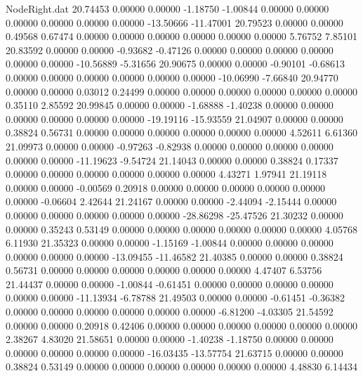 \begin{filecontents}{NodeRight.dat}
  20.74453    0.00000    0.00000    -1.18750   -1.00844    0.00000    0.00000    0.00000    0.00000    0.00000    0.00000  -13.50666  -11.47001
  20.79523    0.00000    0.00000     0.49568    0.67474    0.00000    0.00000    0.00000    0.00000    0.00000    0.00000    5.76752    7.85101
  20.83592    0.00000    0.00000    -0.93682   -0.47126    0.00000    0.00000    0.00000    0.00000    0.00000    0.00000  -10.56889   -5.31656
  20.90675    0.00000    0.00000    -0.90101   -0.68613    0.00000    0.00000    0.00000    0.00000    0.00000    0.00000  -10.06990   -7.66840
  20.94770    0.00000    0.00000     0.03012    0.24499    0.00000    0.00000    0.00000    0.00000    0.00000    0.00000    0.35110    2.85592
  20.99845    0.00000    0.00000    -1.68888   -1.40238    0.00000    0.00000    0.00000    0.00000    0.00000    0.00000  -19.19116  -15.93559
  21.04907    0.00000    0.00000     0.38824    0.56731    0.00000    0.00000    0.00000    0.00000    0.00000    0.00000    4.52611    6.61360
  21.09973    0.00000    0.00000    -0.97263   -0.82938    0.00000    0.00000    0.00000    0.00000    0.00000    0.00000  -11.19623   -9.54724
  21.14043    0.00000    0.00000     0.38824    0.17337    0.00000    0.00000    0.00000    0.00000    0.00000    0.00000    4.43271    1.97941
  21.19118    0.00000    0.00000    -0.00569    0.20918    0.00000    0.00000    0.00000    0.00000    0.00000    0.00000   -0.06604    2.42644
  21.24167    0.00000    0.00000    -2.44094   -2.15444    0.00000    0.00000    0.00000    0.00000    0.00000    0.00000  -28.86298  -25.47526
  21.30232    0.00000    0.00000     0.35243    0.53149    0.00000    0.00000    0.00000    0.00000    0.00000    0.00000    4.05768    6.11930
  21.35323    0.00000    0.00000    -1.15169   -1.00844    0.00000    0.00000    0.00000    0.00000    0.00000    0.00000  -13.09455  -11.46582
  21.40385    0.00000    0.00000     0.38824    0.56731    0.00000    0.00000    0.00000    0.00000    0.00000    0.00000    4.47407    6.53756
  21.44437    0.00000    0.00000    -1.00844   -0.61451    0.00000    0.00000    0.00000    0.00000    0.00000    0.00000  -11.13934   -6.78788
  21.49503    0.00000    0.00000    -0.61451   -0.36382    0.00000    0.00000    0.00000    0.00000    0.00000    0.00000   -6.81200   -4.03305
  21.54592    0.00000    0.00000     0.20918    0.42406    0.00000    0.00000    0.00000    0.00000    0.00000    0.00000    2.38267    4.83020
  21.58651    0.00000    0.00000    -1.40238   -1.18750    0.00000    0.00000    0.00000    0.00000    0.00000    0.00000  -16.03435  -13.57754
  21.63715    0.00000    0.00000     0.38824    0.53149    0.00000    0.00000    0.00000    0.00000    0.00000    0.00000    4.48830    6.14434

\end{filecontents}
